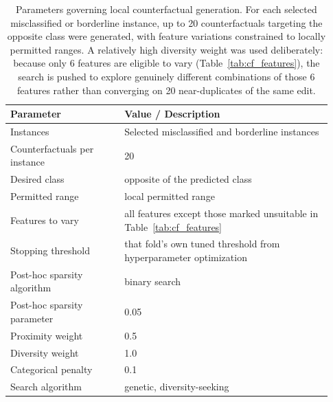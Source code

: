 \documentclass[pdflatex,sn-mathphys-num]{sn-jnl}%
\theoremstyle{thmstyleone}%
\theoremstyle{thmstyletwo}%
\theoremstyle{thmstylethree}%
\begin{document}
\begin{appendices}
\begin{table}[tbp]
    \centering
    \footnotesize
    \begin{tabular}{@{}p{0.33\linewidth} p{0.6\linewidth}@{}}
        \hline
        \textbf{Parameter} & \textbf{Value / Description} \\
        \hline
        Instances & Selected misclassified and borderline instances \\
        Counterfactuals per instance & 20 \\
        Desired class & opposite of the predicted class \\
        Permitted range & local permitted range \\
        Features to vary & all features except those marked unsuitable in Table~\ref{tab:cf_features} \\
        Stopping threshold & that fold's own tuned threshold from hyperparameter optimization \\
        Post-hoc sparsity algorithm & binary search \\
        Post-hoc sparsity parameter & 0.05 \\
        Proximity weight & 0.5 \\
        Diversity weight & 1.0 \\
        Categorical penalty & 0.1 \\
        Search algorithm & genetic, diversity-seeking \\
        \hline
    \end{tabular}
    \caption{Parameters governing local counterfactual generation. For each selected misclassified or borderline instance, up to 20 counterfactuals targeting the opposite class were generated, with feature variations constrained to locally permitted ranges. A relatively high diversity weight was used deliberately: because only 6 features are eligible to vary (Table~\ref{tab:cf_features}), the search is pushed to explore genuinely different combinations of those 6 features rather than converging on 20 near-duplicates of the same edit.}
    \label{tab:local_cf}
\end{table}


\end{appendices}
\end{document}
